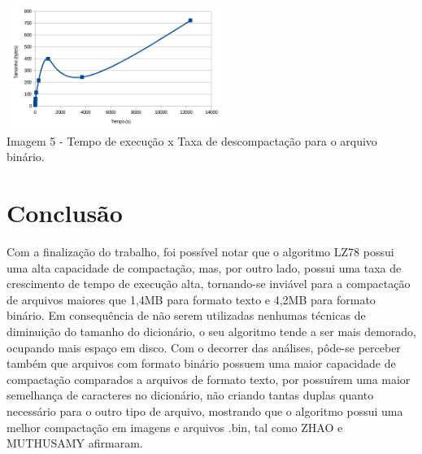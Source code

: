 \documentclass[
	article,			
	11pt,				
	oneside,			
	a4paper,			
	english,			
	brazil,				
	sumario=tradicional
	]{abntex2}
\begin{document}
\begin{center}
	\includegraphics[width=7cm,height=4cm]{UNBIN.png}\\
	Imagem 5 - Tempo de execução x Taxa de descompactação para o arquivo binário.
\end{center}

\section{Conclusão}
Com a finalização do trabalho, foi possível notar que o algoritmo LZ78 possui uma alta capacidade de compactação, mas, por outro lado, possui uma taxa de crescimento de tempo de execução alta, tornando-se inviável para a compactação de arquivos maiores que 1,4MB para formato texto e 4,2MB para formato binário. Em consequência de não serem utilizadas nenhumas técnicas de diminuição do tamanho do dicionário, o seu algoritmo tende a ser mais demorado, ocupando mais espaço em disco. Com o decorrer das análises, pôde-se perceber também que arquivos com formato binário possuem uma maior capacidade de compactação comparados a arquivos de formato texto, por possuírem uma maior semelhança de caracteres no dicionário, não criando tantas duplas quanto necessário para o outro tipo de arquivo, mostrando que o algoritmo possui uma melhor compactação em imagens e arquivos .bin, tal como ZHAO e MUTHUSAMY \cite{muthusamy2012} afirmaram.


\end{document}
